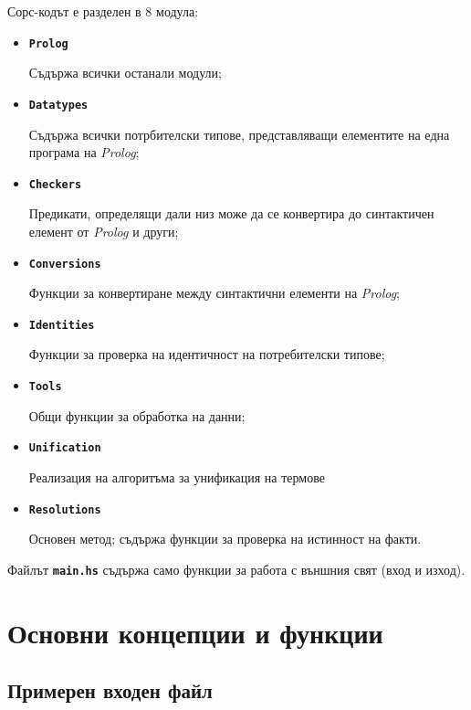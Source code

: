 \documentclass[15pt]{extarticle}
\begin{document}
	Сорс-кодът е разделен в 8 модула:
	\begin{itemize}
		
		\item \textbf{\texttt{Prolog}}
		
		Съдържа всички останали модули;
		
		\item \textbf{\texttt{Datatypes}}
		
		Съдържа всички потрбителски типове, представляващи елементите на една програма на \emph{Prolog};
		
		\item \textbf{\texttt{Checkers}}
		
		Предикати, определящи дали низ може да се конвертира до синтактичен елемент от \emph{Prolog} и други;
		
		\item \textbf{\texttt{Conversions}}
		
		Функции за конвертиране между синтактични елементи на \emph{Prolog};
		
		\item \textbf{\texttt{Identities}}
		
		Функции за проверка на идентичност на потребителски типове;
		
		\item \textbf{\texttt{Tools}}
		
		Общи функции за обработка на данни;
		
		\item \textbf{\texttt{Unification}}
		
		Реализация на алгоритъма за унификация на термове
		
		\item \textbf{\texttt{Resolutions}}
		
		Основен метод; съдържа функции за проверка на истинност на факти.
		
	\end{itemize}

	Файлът \textbf{\texttt{main.hs}} съдържа само функции за работа с външния свят (вход и изход).
	
	\section{Основни концепции и функции}
	
	\subsection{Примерен входен файл}
	
\end{document}
